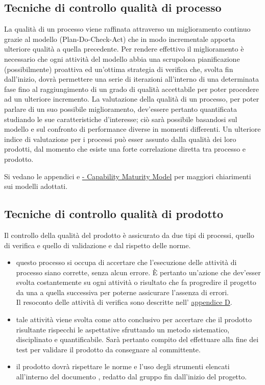 \documentclass[a4paper, titlepage]{article}
\begin{document}
\subsection{Tecniche di controllo qualità di processo}
La qualità di un processo viene raffinata attraverso un miglioramento continuo grazie al modello  (Plan-Do-Check-Act) che in modo incrementale apporta ulteriore qualità a quella precedente. Per rendere effettivo il miglioramento è necessario che ogni attività del modello abbia una scrupolosa pianificazione (possibilmente) proattiva ed un'ottima strategia di verifica che, svolta fin dall'inizio, dovrà permettere una serie di iterazioni all'interno di una determinata fase fino al raggiungimento di un grado di qualità accettabile per poter procedere ad un ulteriore incremento.
\newline La valutazione della qualità di un processo, per poter parlare di un suo possibile miglioramento, dev'essere pertanto quantificata studiando le sue caratteristiche d'interesse; ciò sarà possibile basandosi sul modello  e sul confronto di performance diverse in momenti differenti.
\newline Un ulteriore indice di valutazione per i processi può esser assunto dalla qualità dei loro prodotti, dal momento che esiste una forte correlazione diretta tra processo e prodotto.

Si vedano le appendici \hyperref[app:PDCA]{} e  \hyperref[app:CMM]{ - Capability Maturity Model} per maggiori chiarimenti sui modelli adottati.

\subsection{Tecniche di controllo qualità di prodotto}
Il controllo della qualità del prodotto è assicurato da due tipi di processi, quello di verifica e quello di validazione e dal rispetto delle norme.
\begin{itemize}
\item {} questo processo si occupa di accertare che l'esecuzione delle attività di processo siano corrette, senza alcun errore. È pertanto un'azione che dev'esser svolta costantemente su ogni attività o risultato che fa progredire il progetto da una  a quella successiva per poterne assicurare l'assenza di errori.
\\ Il resoconto delle attività di verifica sono descritte nell' \hyperref[app:valtest]{appendice D}.
\\
\item {} tale attività viene svolta come atto conclusivo per accertare che il prodotto risultante rispecchi le aspettative sfruttando un metodo sistematico, disciplinato e quantificabile. Sarà pertanto compito del  effettuare alla fine dei test per validare il prodotto da consegnare al committente.
\\
\item {} il prodotto dovrà rispettare le norme e l'uso degli strumenti elencati all'interno del documento , redatto dal gruppo fin dall'inizio del progetto.
\end{itemize}
\end{document}
